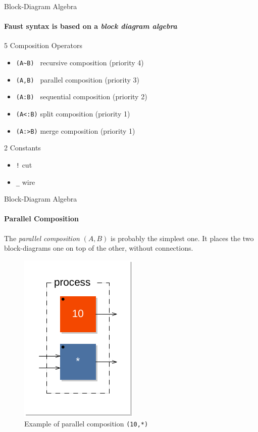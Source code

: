 \begin{frame}[fragile]{Block-Diagram Algebra}
\framesubtitle{Faust syntax is based on a \emph{block diagram algebra}} 

	\begin{exampleblock}{5 Composition Operators}
		\begin{itemize}
		\item \lstinline'(A~B) ' recursive composition (priority 4)
		\item \lstinline'(A,B) ' parallel composition (priority 3)
		\item \lstinline'(A:B) ' sequential composition (priority 2)
		\item \lstinline'(A<:B)' split composition (priority 1)
		\item \lstinline'(A:>B)' merge composition (priority 1)
		\end{itemize}
	\end{exampleblock}
	
	\begin{exampleblock}{2 Constants}
		\begin{itemize}
		\item \lstinline'!' cut
		\item \lstinline'_' wire
		\end{itemize}
	\end{exampleblock}


\end{frame}


\begin{frame}[fragile]{Block-Diagram Algebra}
\framesubtitle{Parallel Composition}
The \emph{parallel composition} $(A,B)$ is probably the simplest one. It places the two block-dia\-grams one on top of the other, without connections. 

\begin{figure}[h]
\centering
\includegraphics[scale=0.5]{images/par1}
\caption{Example of parallel composition  \lstinline'(10,*)'}
\label{figure:par1}
\end{figure}

\end{frame}

